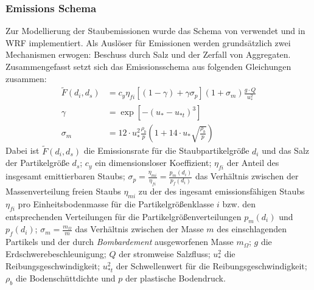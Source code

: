 \documentclass[12pt,a4paper,onecolumn]{scrartcl}
\begin{document}
\subsubsection{Emissions Schema}
Zur Modellierung der Staubemissionen wurde das Schema von \citet{Shao.2004} verwendet und in WRF implementiert. Als Auslöser für Emissionen werden grundsätzlich zwei Mechanismen erwogen: Beschuss durch Salz und der Zerfall von Aggregaten. Zusammengefasst setzt sich das Emissionsschema \citep{Shao.2004} aus folgenden Gleichungen zusammen:
\begin{align}
\tilde{F} (d_i,d_s) &= c_y \eta_{fi} \left[\left(1-\gamma\right) + \gamma
\sigma_p \right] \left(1+\sigma_m \right) \frac{g \cdot Q}{u^2_*} \\
\gamma &= \exp \left[-\left(u_* - u_{*t} \right)^3\right] \\
\sigma_m &= 12 \cdot u_*^2 \frac{\rho_b}{p} \left(1 +14 \cdot u_* \sqrt{\frac{\rho_b}{p}} \right)
\end{align}
Dabei ist $\tilde{F}(d_i,d_s)$ die Emissionsrate für die Staubpartikelgröße $d_i$ und das Salz der Partikelgröße $d_s$; $c_y$ ein dimensionsloser Koeffizient; $\eta_{fi}$ der Anteil des insgesamt emittierbaren Staubs; $\sigma_p = \frac{\eta_{mi}}{\eta_{fi}} = \frac{p_{m}(d_i)}{p_{f}(d_i)}$ das Verhältnis zwischen der Massenverteilung freien Staubs $\eta_{mi}$ zu der des ingesamt emissionsfähigen Staubs $\eta_{fi}$ pro Einheitsbodenmasse für die Partikelgrößenklasse $i$ bzw. den entsprechenden Verteilungen für die Partikelgrößenverteilungen $p_{m}(d_i)$ und $p_{f}(d_i)$;  $\sigma_m= \frac{m_\Omega}{m}$ das Verhältnis zwischen der Masse  $m$ des einschlagenden Partikels und der durch \textit{Bombardement} ausgeworfenen Masse $m_\Omega$; $g$ die Erdschwerebeschleunigung; $Q$ der stromweise Salzfluss; $u_*^2$ die Reibungsgeschwindigkeit; $u_{*t}^2$ der Schwellenwert für die Reibungsgeschwindigkeit; $\rho_b$ die Bodenschüttdichte und $p$ der plastische Bodendruck.
\end{document}
